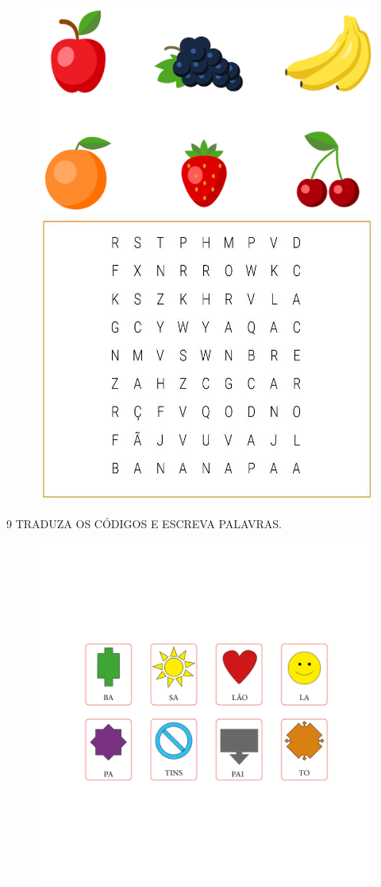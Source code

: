 \begin{figure}[H]
\centering\includegraphics[width=.6\textwidth]{media/image98a103.png}

\vspace{0.5cm}

\centering\includegraphics[width=.9\textwidth]{media/image97.png}
\end{figure}



\num{9} TRADUZA OS CÓDIGOS E ESCREVA PALAVRAS.

\begin{figure}[H]
\centering\includegraphics[width=.73\textwidth]{media/flag1.png}
\end{figure}


